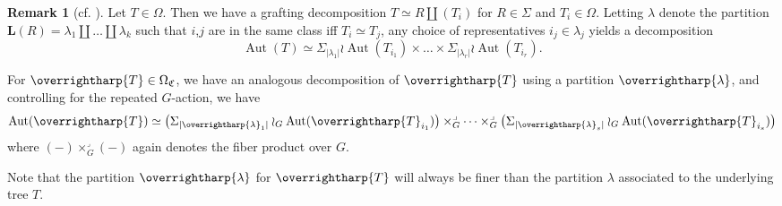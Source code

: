 \documentclass[a4paper,10pt
,draft
]{article}%
\numberwithin{equation}{section}
\numberwithin{figure}{section}
\newtheorem{proposition}[equation]{Proposition}%
\theoremstyle{definition} %
\newtheorem{remark}[equation]{Remark}%
\newcommand{\longto}{\longrightarrow}%
\newcommand{\vect}[1]{\text{\overrightharp{\ensuremath{#1}}}}
\DeclareMathOperator{\Aut}{Aut}%
\newcommand{\F}{\ensuremath{\mathcal F}}
\newcommand{\V}{\ensuremath{\mathcal V}}
\newcommand{\1}{\ensuremath{\mathbbm 1}}%
\begin{document}


\begin{remark}[{cf. \cite[Remark 6.48]{BP_geo}}]
      \label{AUTT_REM}
      Let $T \in \Omega$. Then we have a grafting decomposition $T \simeq R \amalg (T_i)$ for $R \in \Sigma$ and $T_i \in \Omega$.
      Letting $\lambda$ denote the partition $\boldsymbol{L}(R) = \lambda_1 \amalg \dots \amalg \lambda_k$ such that
      $i$,$j$ are in the same class iff $T_i \simeq T_j$,
      any choice of representatives $i_j \in \lambda_j$ yields a decomposition
      \[
            \Aut(T) \simeq \Sigma_{|\lambda_1|} \wr \Aut(T_{i_1}) \times \dots \times \Sigma_{|\lambda_r|} \wr \Aut(T_{i_r}).
      \]
      
      For $\vect T \in \Omega_{\mathfrak C}$, we have an analogous decomposition of $\vect T$ using a partition $\vect \lambda$,
      and controlling for the repeated $G$-action, we have
      \[
            \Aut(\vect T) \simeq \big(\Sigma_{|\vect \lambda_1|} \wr_G \Aut(\vect T_{i_1})\big) \times_G^\lrcorner \dots \times_G^\lrcorner \big(\Sigma_{|\vect \lambda_s|} \wr_G \Aut(\vect T_{i_s})\big)
      \]
      where $(-) \times_G^\lrcorner (-)$ again denotes the fiber product over $G$.

      Note that the partition $\vect \lambda$ for $\vect T$ will always be finer than
      the partition $\lambda$ associated to the underlying tree $T$.
\end{remark}
\end{document}
